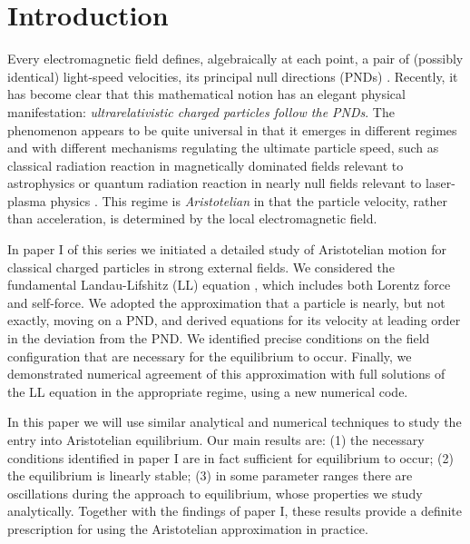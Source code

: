 \documentclass[amsmath,amssymb,nofootinbib,notitlepage,superscriptaddress,twocolumn]{revtex4-2}
\begin{document}
\section{Introduction}

Every electromagnetic field defines, algebraically at each point, a pair of (possibly identical) light-speed velocities, its principal null directions (PNDs) \cite{synge1956relativity}.  Recently, it has become clear that this mathematical notion has an elegant physical manifestation: \textit{ultrarelativistic charged particles follow the PNDs}.  The phenomenon appears to be quite universal in that it emerges in different regimes and with different mechanisms regulating the ultimate particle speed, such as classical radiation reaction in magnetically dominated fields relevant to astrophysics \cite{mestel1985,BFink1989,gruzinov2013b,Jacobson:2015cia,Petri:2019tix,Cao:2019uhv} or quantum radiation reaction in nearly null fields relevant to laser-plasma physics \cite{Gonoskov:2017lyz,Samsonov:2018skj,Ekman:2021vwg,Gonoskov:2021hwf,Samsonov2022}.  This regime is \textit{Aristotelian} in that the particle velocity, rather than acceleration, is determined by the local electromagnetic field.

In paper I of this series \cite{Cai:2022mkw} we initiated a detailed study of Aristotelian motion for classical charged particles in strong external fields.  We considered the fundamental Landau-Lifshitz (LL) equation \cite{LL}, which includes both Lorentz force and self-force.  We adopted the approximation that a particle is nearly, but not exactly, moving on a PND, and derived equations for its velocity at leading order in the deviation from the PND.  We identified precise conditions on the field configuration that are necessary for the equilibrium to occur.  Finally, we demonstrated numerical agreement of this approximation with full solutions of the LL equation in the appropriate regime, using a new numerical code.

In this paper we will use similar analytical and numerical techniques to study the entry  into Aristotelian equilibrium.  Our main results are: (1) the necessary conditions identified in paper I are in fact sufficient for equilibrium to occur; (2) the equilibrium is linearly stable; (3) in some parameter ranges there are oscillations during the approach to equilibrium, whose properties we study analytically.  Together with the findings of paper I, these results provide a definite prescription for using the Aristotelian approximation in practice.
\end{document}
